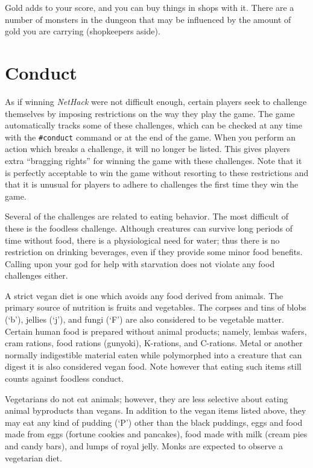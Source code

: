 Gold adds to your score, and you can buy things in shops with it.
There are a number
of monsters in the dungeon that may be influenced by the amount of gold
you are carrying (shopkeepers aside).

\section{Conduct}

As if winning {\it NetHack\/} were not difficult enough, certain players
seek to challenge themselves by imposing restrictions on the
way they play the game.  The game automatically tracks some of
these challenges, which can be checked at any time with the {\tt \#conduct}
command or at the end of the game.  When you perform an action which
breaks a challenge, it will no longer be listed.  This gives
players extra ``bragging rights'' for winning the game with these
challenges.  Note that it is perfectly acceptable to win the game
without resorting to these restrictions and that it is unusual for
players to adhere to challenges the first time they win the game.

Several of the challenges are related to eating behavior.  The most
difficult of these is the foodless challenge.  Although creatures
can survive long periods of time without food, there is a physiological
need for water; thus there is no restriction on drinking beverages,
even if they provide some minor food benefits.
Calling upon your god for help with starvation does
not violate any food challenges either.

A strict vegan diet is one which avoids any food derived from animals.
The primary source of nutrition is fruits and vegetables.  The
corpses and tins of blobs (`b'), jellies (`j'), and fungi (`F') are
also considered to be vegetable matter.  Certain human
food is prepared without animal products; namely, lembas wafers, cram
rations, food rations (gunyoki), K-rations, and C-rations.
Metal or another normally indigestible material eaten while polymorphed
into a creature that can digest it is also considered vegan food.
Note however that eating such items still counts against foodless conduct.

Vegetarians do not eat animals;
however, they are less selective about eating animal byproducts than vegans.
In addition to the vegan items listed above, they may eat any kind
of pudding (`P') other than the black puddings,
eggs and food made from eggs (fortune cookies and pancakes),
food made with milk (cream pies and candy bars), and lumps of
royal jelly.  Monks are expected to observe a vegetarian diet.

